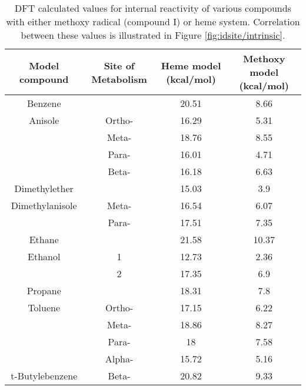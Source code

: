 \begin{table}[h]
\centering
\label{table:heme_methoxy}
\begin{tabular}{cccc}
\hline
Model compound & Site of Metabolism & Heme model (kcal/mol) & Methoxy model (kcal/mol) \\
\hline
Benzene &  & 20.51 & 8.66 \\
Anisole & Ortho- & 16.29 & 5.31 \\
 & Meta- & 18.76 & 8.55 \\
 & Para- & 16.01 & 4.71 \\
 & Beta- & 16.18 & 6.63 \\
Dimethylether &  & 15.03 & 3.9 \\
Dimethylanisole & Meta- & 16.54 & 6.07 \\
 & Para- & 17.51 & 7.35 \\
Ethane &  & 21.58 & 10.37 \\
Ethanol & 1 & 12.73 & 2.36 \\
 & 2 & 17.35 & 6.9 \\
Propane &  & 18.31 & 7.8 \\
Toluene & Ortho- & 17.15 & 6.22 \\
 & Meta- & 18.86 & 8.27 \\
 & Para- & 18 & 7.58 \\
 & Alpha- & 15.72 & 5.16 \\
t-Butylebenzene & Beta- & 20.82 & 9.33 \\
\hline
\end{tabular}
\caption{DFT calculated values for internal reactivity of various compounds with either methoxy radical (compound I) or heme system.
Correlation between these values is illustrated in Figure \ref{fig:idsite/intrinsic}.}
\end{table}
